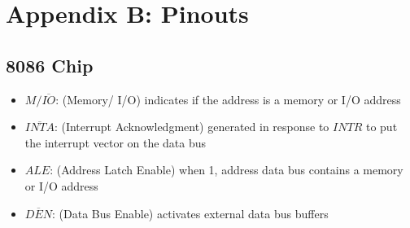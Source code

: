     \clearpage
    \newpage

    \section{Appendix B: Pinouts} \label{appendix:pinouts}

        \subsection{8086 Chip}

                \begin{itemize}

                    \item $M/\overline{IO}$: (Memory/ I/O) indicates if the address is a memory or I/O address

                    \item $\overline{INTA}$: (Interrupt Acknowledgment) generated in response to $INTR$ to put the interrupt vector on the data bus

                    \item $ALE$: (Address Latch Enable) when 1, address data bus contains a memory or I/O address

                    \item $\overline{DEN}$: (Data Bus Enable) activates external data bus buffers

                \end{itemize}

